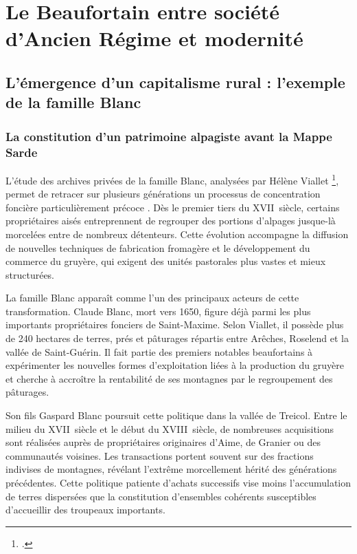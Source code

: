 \documentclass[12pt,a4paper]{report}
\begin{document}
\chapter{Le Beaufortain entre société d'Ancien Régime et modernité}

\section{L'émergence d'un capitalisme rural : l'exemple de la famille Blanc}
	\subsection{La constitution d'un patrimoine alpagiste avant la Mappe Sarde}
	
	L'étude des archives privées de la famille Blanc, analysées par Hélène Viallet \footcite{Viallet1990Blanc}, permet de retracer sur plusieurs générations un processus de concentration foncière particulièrement précoce . Dès le premier tiers du XVII\ieme\ siècle, certains propriétaires aisés entreprennent de regrouper des portions d'alpages jusque-là morcelées entre de nombreux détenteurs. Cette évolution accompagne la diffusion de nouvelles techniques de fabrication fromagère et le développement du commerce du gruyère, qui exigent des unités pastorales plus vastes et mieux structurées.
	
	La famille Blanc apparaît comme l'un des principaux acteurs de cette transformation. Claude Blanc, mort vers 1650, figure déjà parmi les plus importants propriétaires fonciers de Saint-Maxime. Selon Viallet, il possède plus de 240 hectares de terres, prés et pâturages répartis entre Arêches, Roselend et la vallée de Saint-Guérin. Il fait partie des premiers notables beaufortains à expérimenter les nouvelles formes d'exploitation liées à la production du gruyère et cherche à accroître la rentabilité de ses montagnes par le regroupement des pâturages.
	
	Son fils Gaspard Blanc poursuit cette politique dans la vallée de Treicol. Entre le milieu du XVII\ieme\ siècle et le début du XVIII\ieme\ siècle, de nombreuses acquisitions sont réalisées auprès de propriétaires originaires d'Aime, de Granier ou des communautés voisines. Les transactions portent souvent sur des fractions indivises de montagnes, révélant l'extrême morcellement hérité des générations précédentes. Cette politique patiente d'achats successifs vise moins l'accumulation de terres dispersées que la constitution d'ensembles cohérents susceptibles d'accueillir des troupeaux importants.
	
\end{document}
